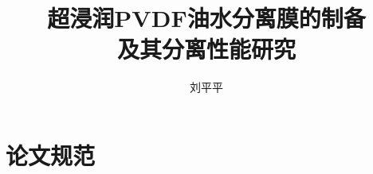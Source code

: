 \documentclass[master,pdf]{ustcthesis}
\title{超浸润PVDF油水分离膜的制备\\及其分离性能研究}
\author{刘平平}
\begin{document}
\maketitle

%

\frontmatter

\tableofcontents
% 

\mainmatter










\appendix
\chapter{论文规范}

\backmatter


\end{document}
